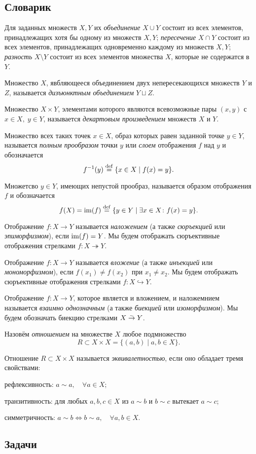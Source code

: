 \documentclass[10pt]{article}
\begin{document}
\subsection*{Словарик}
\begin{bullets}
    \item Для заданных множеств $X, Y$ их \emph{объединение} $X \cup Y$ состоит из всех элементов, принадлежащих хотя бы одному из множеств $X, Y$; \emph{пересечение} $X \cap Y$ состоит из всех элементов, принадлежащих одновременно каждому из множеств $X, Y$; \emph{разность} $X \setminus Y$ состоит из всех элементов множества $X$, которые не содержатся в $Y$.
    \item Множество $X$, явбляющееся объединением двух непересекающихся множеств $Y$ и $Z$, называется \emph{дизъюнктным объединением} $Y \sqcup Z$.
    \item Множество $X \times Y$, элементами которого являются всевозможные пары $(x, y)$ с $x \in X,\; y \in Y$, называется \emph{декартовым произведением} множеств $X$ и $Y$.
    \item Множество всех таких точек $x \in X$, образ которых равен заданной точке $y \in Y$, называется \emph{полным прообразом} точки $y$ или \emph{слоем} отображения $f$ над $y$ и обозначается \[f^{-1}(y) \overset{\footnotesize{\mathrm{def}}}{=} \{x \in X \mid f(x) = y \} .\]
    \item Множетсво $y \in Y$, имеющих непустой прообраз, называется образом отображения $f$ и обозначается \[ f(X) = \operatorname{im} (f) \overset{\footnotesize{\mathrm{def}}}{=} \{y \in Y \mid \exists x \in X \colon f(x) = y \}. \]
    \item Отображение $f \colon X \to Y$ называется \emph{наложением} (а также \emph{сюръекцией} или \emph{эпиморфизмом}), если $\operatorname{im}(f) = Y$. Мы будем отображать сюръективные отображения стрелками $f \colon X \twoheadrightarrow Y$. 
    \item Отображение $f \colon X \to Y$ называется \emph{вложение} (а также \emph{инъекцией} или \emph{мономорфизмом}), если $f(x_1) \neq f(x_2)$ при $x_1 \neq x_2$. Мы будем отображать сюръективные отображения стрелками $f \colon X \hookrightarrow Y$. 
    \item Отображение $f \colon X \to Y$, которое является и вложением, и наложемнием называется \emph{взаимно однозначным} (а также \emph{биекцией} или \emph{изоморфизмом}). Мы будем обозначать биекцию стрелками $X \overset{_\sim}{\to} Y$.
    \item Назовём \emph{отношением} на множестве $X$ любое подмножество \[R \subset X\times X = \{(a, b)\mid a, b \in X\}.\]
    \item Отношение $R \subset X \times X$ называется \emph{эквивалетностью}, если оно обладает тремя свойствами: 
    \begin{conditions}
    \item рефлексивность: $a \sim a, \quad \forall a \in X$;
    \item транзитивность: для любых $a, b, c \in X$ из $a \sim b$ и $b \sim c $ вытекает $a \sim c$;
    \item симметричность: $a \sim b \iff b \sim a, \quad \forall a, b \in X$. \end{conditions}

\end{bullets}

\subsection*{Задачи}

\end{document}
